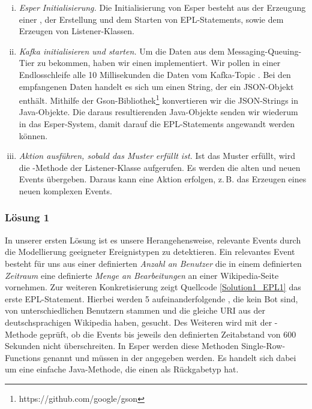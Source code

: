 \begin{enumerate}[i.]
    \item \textit{Esper Initialisierung.} Die Initialisierung von Esper besteht aus der Erzeugung einer ,
    der Erstellung und dem Starten von EPL-Statements, sowie dem Erzeugen von Listener-Klassen.
    \item \textit{Kafka initialisieren und starten.} Um die Daten aus dem Messaging-Queuing-Tier zu bekommen, haben wir einen
     implementiert.
    Wir pollen in einer Endlosschleife alle 10 Millisekunden die Daten vom Kafka-Topic . Bei den empfangenen Daten
    handelt es sich um einen String, der ein JSON-Objekt enthält. Mithilfe der Gson-Bibliothek\footnote{https://github.com/google/gson}
    konvertieren wir die JSON-Strings in Java-Objekte. Die daraus resultierenden Java-Objekte senden wir wiederum in das
    Esper-System, damit darauf die EPL-Statements angewandt werden können.
    \item \textit{Aktion ausführen, sobald das Muster erfüllt ist.} Ist das Muster erfüllt, wird die -Methode der Listener-Klasse
    aufgerufen. Es werden die alten und neuen Events übergeben. Daraus kann eine Aktion erfolgen, z.\,B. das Erzeugen eines neuen
    komplexen Events.
\end{enumerate}


\subsubsection{Lösung 1}
In unserer ersten Lösung ist es unsere Herangehensweise, relevante Events durch die Modellierung geeigneter Ereignistypen zu detektieren.
Ein relevantes Event besteht für uns aus einer definierten \textit{Anzahl an Benutzer} die in einem
definierten \textit{Zeitraum} eine definierte \textit{Menge an Bearbeitungen} an einer Wikipedia-Seite vornehmen.
Zur weiteren Konkretisierung zeigt Quellcode \ref{Solution1_EPL1} das erste EPL-Statement. Hierbei werden
5 aufeinanderfolgende , die kein Bot sind, von unterschiedlichen Benutzern stammen
und die gleiche URI aus der deutschsprachigen Wikipedia haben, gesucht. Des Weiteren wird mit der -Methode
geprüft, ob die Events  bis  jeweils den definierten Zeitabstand von 600 Sekunden nicht überschreiten.
In Esper werden diese Methoden Single-Row-Functions genannt und müssen in der  angegeben werden.
Es handelt sich dabei um eine einfache Java-Methode, die einen  als Rückgabetyp hat.

